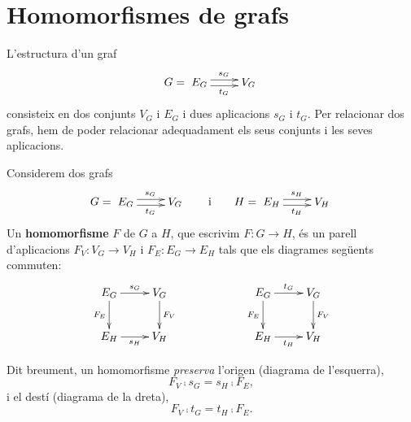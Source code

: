 \section{Homomorfismes de grafs}\label{sec:grafs-homomorfismes}

L'estructura d'un graf
\[
G=\xymatrix{
E_G \ar@<0.6ex>[r]^{s_G} \ar@<-0.6ex>[r]_{t_G} & V_G
}
\]
consisteix en dos conjunts $V_G$ i $E_G$ i dues aplicacions $s_G$ i $t_G$. Per relacionar dos grafs, hem de poder relacionar adequadament els seus conjunts i les seves aplicacions.

\begin{definicio}
Considerem dos grafs
\[
G=\xymatrix{
E_G \ar@<0.6ex>[r]^{s_G} \ar@<-0.6ex>[r]_{t_G} & V_G
}
\qquad\text{i}\qquad
H=\xymatrix{
E_H \ar@<0.6ex>[r]^{s_H} \ar@<-0.6ex>[r]_{t_H} & V_H
}
\]
Un \textbf{homomorfisme} $F$ de $G$ a $H$, que escrivim $F\colon G\to H$, és un parell d'aplicacions $F_V\colon V_G\to V_H$ i $F_E\colon E_G\to E_H$ tals que els diagrames següents commuten:
\begin{equation}\label{grafs:hom}
\xymatrix{
	E_G \ar[d]_-{F_E} \ar[r]^-{s_G} & V_G \ar[d]^-{F_V}\\
	E_H \ar[r]_-{s_H} & V_H
}
\hspace{2cm}
\xymatrix{
	E_G \ar[d]_-{F_E} \ar[r]^-{t_G} & V_G \ar[d]^-{F_V}\\
	E_H \ar[r]_-{t_H} & V_H
}
\end{equation}
\end{definicio}

Dit breument, un homomorfisme \emph{preserva} l'origen (diagrama de l'esquerra),
\[
F_V\comp s_G=s_H\comp F_E,
\]
i el destí (diagrama de la dreta),
\[
F_V\comp t_G=t_H\comp F_E.
\]

